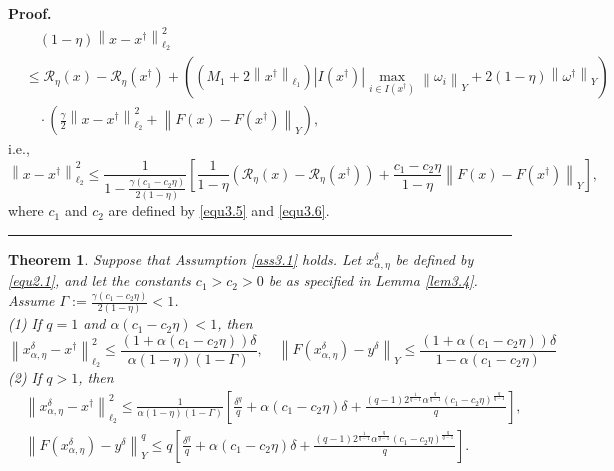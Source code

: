 \documentclass[a4paper,12pt]{article}
\newtheorem{theorem}{Theorem}[section]
\numberwithin{equation}{section}
\newenvironment{proof}[1][Proof]{\textbf{#1.} }
{\ \rule{0.75em}{0.75em}\smallskip}
\begin{document}
\begin{proof}
    \begin{align*}
        & \quad \left(1-\eta\right)\left\|x-x^{\dagger}\right\|_{\ell_{2}}^{2} \\
        & \leq \mathcal{R}_{\eta}\left(x\right)-\mathcal{R}_{\eta}\left(x^{\dagger}\right) + \left(\left(M_{1}+2\left\|x^{\dagger}\right\|_{\ell_{1}}\right) \left|I\left(x^{\dagger}\right)\right|\max_{i\in I\left(x^{\dagger}\right)}\left\|\omega_{i}\right\|_{Y} + 2\left(1-\eta\right)\left\|\omega^{\dagger}\right\|_{Y}\right) \\
        & \quad \cdot\left(\frac{\gamma}{2}\left\|x-x^{\dagger}\right\|_{\ell_{2}}^{2}+ \left\|F\left(x\right)-F\left(x^{\dagger}\right)\right\|_{Y}\right),
    \end{align*}
    i.e.,
    \begin{equation*}
        \left\|x-x^{\dagger}\right\|_{\ell_{2}}^{2} \leq \frac{1}{1-\frac{\gamma\left(c_{1}-c_{2}\eta\right)}{2\left(1-\eta\right)}} \left[\frac{1}{1-\eta}\left(\mathcal{R}_{\eta}\left(x\right)- \mathcal{R}_{\eta}\left(x^{\dagger}\right)\right)+ \frac{c_{1}-c_{2}\eta}{1-\eta} \left\|F\left(x\right)-F\left(x^{\dagger}\right)\right\|_{Y}\right],
    \end{equation*}
    where $c_{1}$ and $c_{2}$ are defined by \eqref{equ3.5} and \eqref{equ3.6}.
\end{proof}

\begin{theorem}\label{the3.5}
    Suppose that Assumption \ref{ass3.1} holds. Let $x_{\alpha,\eta}^{\delta}$ be defined by \eqref{equ2.1}, and let the constants $c_{1}>c_{2}>0$ be as specified in Lemma \ref{lem3.4}. Assume $\Gamma:=\frac{\gamma\left(c_{1}-c_{2}\eta\right)}{2\left(1-\eta\right)}<1$. \\
    (1) If $q=1$ and $\alpha\left(c_{1}-c_{2}\eta\right) < 1$, then
    \begin{equation}\label{equ3.15}
        \left\|x_{\alpha,\eta}^{\delta}-x^{\dagger}\right\|_{\ell_{2}}^{2}\leq \frac{\left(1+\alpha\left(c_{1}-c_{2}\eta\right)\right)\delta}{\alpha\left(1-\eta\right) \left(1-\Gamma\right)} ,\quad \left\|F\left(x_{\alpha,\eta}^{\delta}\right)-y^{\delta}\right\|_{Y}\leq \frac{\left(1+\alpha\left(c_{1}-c_{2}\eta\right)\right)\delta}{1- \alpha\left(c_{1}-c_{2}\eta\right)}
    \end{equation}
    (2) If $q>1$, then
    \begin{align}\label{equ3.16}
        & \left\|x_{\alpha,\eta}^{\delta}-x^{\dagger}\right\|_{\ell_{2}}^{2} \leq \frac{1}{\alpha\left(1-\eta\right) \left(1-\Gamma\right)} \left[\frac{\delta^{q}}{q}+\alpha\left(c_{1}-c_{2}\eta\right)\delta+ \frac{\left(q-1\right)2^{\frac{1}{q-1}}\alpha^{\frac{q}{q-1}} \left(c_{1}-c_{2}\eta\right)^{\frac{q}{q-1}}}{q}\right], \nonumber\\ 
        & \left\|F\left(x_{\alpha,\eta}^{\delta}\right)-y^{\delta}\right\|_{Y}^{q} \leq q  \left[\frac{\delta^{q}}{q}+\alpha\left(c_{1}-c_{2}\eta\right)\delta+ \frac{\left(q-1\right)2^{\frac{1}{q-1}}\alpha^{\frac{q}{q-1}} \left(c_{1}-c_{2}\eta\right)^{\frac{q}{q-1}}}{q}\right].
    \end{align}
\end{theorem}
\end{document}
